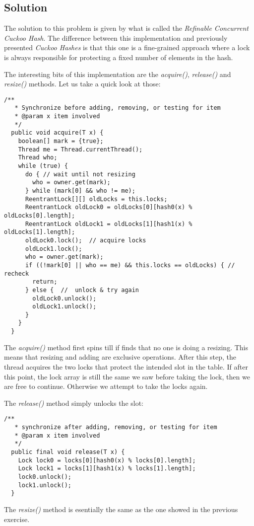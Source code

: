 \subsection{Solution}
\par
The solution to this problem is given by what is called the \textit{Refinable
Concurrent Cuckoo Hash}. The difference between this implementation and
previously presented \textit{Cuckoo Hashes} is that this one is a fine-grained
approach where a lock is always responsible for protecting a fixed number of
elements in the hash.
\par
The interesting bits of this implementation are the \textit{acquire()},
\textit{release()} and \textit{resize()} methods. Let us take a quick look at those:
\par
\hfill
\begin{lstlisting}[style=numbers]
  /**
   * Synchronize before adding, removing, or testing for item
   * @param x item involved
   */
  public void acquire(T x) {
    boolean[] mark = {true};
    Thread me = Thread.currentThread();
    Thread who;
    while (true) {
      do { // wait until not resizing
        who = owner.get(mark);
      } while (mark[0] && who != me);
      ReentrantLock[][] oldLocks = this.locks;
      ReentrantLock oldLock0 = oldLocks[0][hash0(x) % oldLocks[0].length];
      ReentrantLock oldLock1 = oldLocks[1][hash1(x) % oldLocks[1].length];
      oldLock0.lock();  // acquire locks
      oldLock1.lock();
      who = owner.get(mark);
      if ((!mark[0] || who == me) && this.locks == oldLocks) { // recheck
        return;
      } else {  //  unlock & try again
        oldLock0.unlock();
        oldLock1.unlock();
      }
    }
  }
\end{lstlisting}
\hfill
\par
The \textit{acquire()} method first spins till if finds that no one is doing a
resizing. This means that resizing and adding are exclusive operations. After
this step, the thread acquires the two locks that protect the intended slot in
the table. If after this point, the lock array is still the same we saw before
taking the lock, then we are free to continue. Otherwise we attempt to take the
locks again.
\par
The \textit{release()} method simply unlocks the slot: 
\par
\hfill
\begin{lstlisting}[style=numbers]
  /**
   * synchronize after adding, removing, or testing for item
   * @param x item involved
   */
  public final void release(T x) {
    Lock lock0 = locks[0][hash0(x) % locks[0].length];
    Lock lock1 = locks[1][hash1(x) % locks[1].length];
    lock0.unlock();
    lock1.unlock();
  }
\end{lstlisting}
\hfill
\par
The \textit{resize()} method is esentially the same as the one showed in the
previous exercise.
\par
